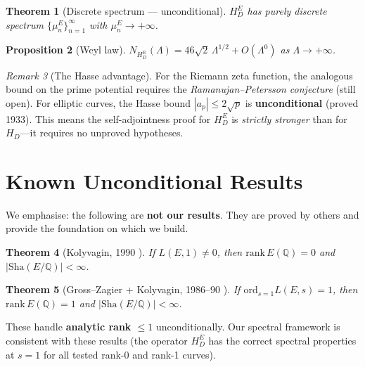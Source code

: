 \documentclass[11pt,a4paper]{article}
\theoremstyle{plain}
\newtheorem{theorem}{Theorem}[section]
\newtheorem{proposition}[theorem]{Proposition}
\theoremstyle{definition}
\theoremstyle{remark}
\newtheorem{remark}[theorem]{Remark}
\begin{document}
\begin{theorem}[Discrete spectrum --- unconditional]
$H_D^E$ has purely discrete spectrum $\{\mu_n^E\}_{n=1}^\infty$ with $\mu_n^E \to +\infty$.
\end{theorem}

\begin{proposition}[Weyl law]
$N_{H_D^E}(\Lambda) = 46\sqrt{2}\,\Lambda^{1/2} + O(\Lambda^0)$ as $\Lambda \to +\infty$.
\end{proposition}

\begin{remark}[The Hasse advantage]
For the Riemann zeta function, the analogous bound on the prime potential requires the \emph{Ramanujan--Petersson conjecture} (still open). For elliptic curves, the Hasse bound $|a_p| \leq 2\sqrt{p}$ is \textbf{unconditional} (proved 1933). This means the self-adjointness proof for $H_D^E$ is \emph{strictly stronger} than for $H_D$---it requires no unproved hypotheses.
\end{remark}

\section{Known Unconditional Results}

We emphasise: the following are \textbf{not our results}. They are proved by others and provide the foundation on which we build.

\begin{theorem}[Kolyvagin, 1990 \cite{Kolyvagin1990}]
If $L(E,1) \neq 0$, then $\text{rank}\,E(\mathbb{Q}) = 0$ and $|\text{Sha}(E/\mathbb{Q})| < \infty$.
\end{theorem}

\begin{theorem}[Gross--Zagier + Kolyvagin, 1986--90 \cite{GrossZagier1986, Kolyvagin1990}]
If $\text{ord}_{s=1} L(E,s) = 1$, then $\text{rank}\,E(\mathbb{Q}) = 1$ and $|\text{Sha}(E/\mathbb{Q})| < \infty$.
\end{theorem}

These handle \textbf{analytic rank $\leq 1$} unconditionally. Our spectral framework is consistent with these results (the operator $H_D^E$ has the correct spectral properties at $s = 1$ for all tested rank-0 and rank-1 curves).

\end{document}
